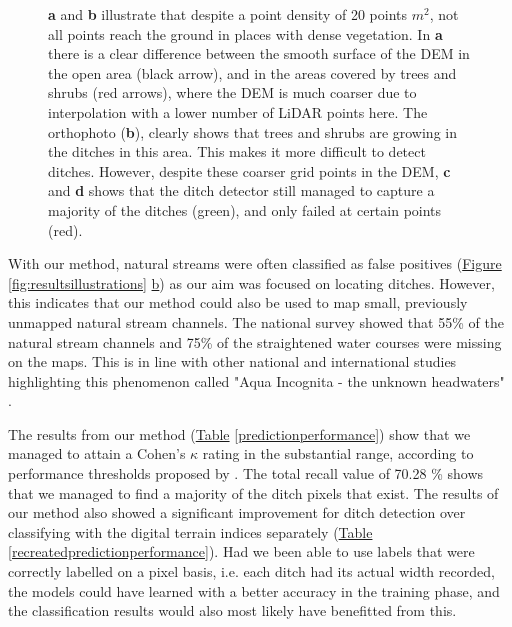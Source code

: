 \documentclass[]{interact}
\theoremstyle{plain}%
\theoremstyle{definition}
\theoremstyle{remark}
\begin{document}
\begin{figure} [!htb]
    \caption{\textbf{a} and \textbf{b} illustrate that despite a point density of 20 points $m^2$, not all points reach the ground in places with dense vegetation. In \textbf{a} there is a clear difference between the smooth surface of the DEM in the open area (black arrow), and in the areas covered by trees and shrubs (red arrows), where the DEM is much coarser due to interpolation with a lower number of LiDAR points here. The orthophoto (\textbf{b}), clearly shows that trees and shrubs are growing in the ditches in this area. This makes it more difficult to detect ditches. However, despite these coarser grid points in the DEM, \textbf{c} and \textbf{d} shows that the ditch detector still managed to capture a majority of the ditches (green), and only failed at certain points (red).}
    \label{fig:resultstreesbushes}
\end{figure}

With our method, natural streams were often classified as false positives (\hyperref[fig:resultsillustrations]{Figure} \ref{fig:resultsillustrations} \hyperref[fig:resultsillustrations]{b}) as our aim was focused on locating ditches. However, this indicates that our method could also be used to map small, previously unmapped natural stream channels. The national survey showed that 55\% of the natural stream channels and 75\% of the straightened water courses were missing on the maps. This is in line with other national \citep{kuglerova} and international \citep{benstead} studies highlighting this phenomenon called "Aqua Incognita - the unknown headwaters" \citep{bishop,kuglerova}.

The results from our method (\hyperref[predictionperformance]{Table} \ref{predictionperformance}) show that we managed to attain a Cohen's $\kappa$ rating in the substantial range, according to performance thresholds proposed by \citet{kappaanalysis}. The total recall value of 70.28 \% shows that we managed to find a majority of the ditch pixels that exist. The results of our method also showed a significant improvement for ditch detection over classifying with the digital terrain indices separately (\hyperref[recreatedpredictionperformance]{Table} \ref{recreatedpredictionperformance}). Had we been able to use labels that were correctly labelled on a pixel basis, i.e. each ditch had its actual width recorded, the models could have learned with a better accuracy in the training phase, and the classification results would also most likely have benefitted from this.
\end{document}
